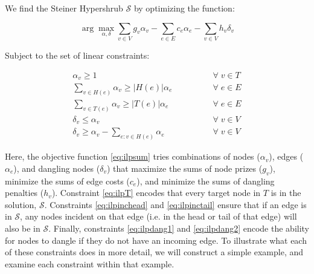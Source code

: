 \documentclass[12pt,twoside]{reedthesis}
\theoremstyle{definition}
\newcommand{\argmax}{\arg\!\max}
\begin{document}
We find the Steiner Hypershrub $\mathcal{S}$ by optimizing the function:

\begin{equation} \label{eq:ilpsum}
 \argmax_{\alpha, \delta} \sum_{v \in V} g_v \alpha_v - \sum_{e \in E} c_e \alpha_e - \sum_{v \in V} h_v \delta_v
\end{equation}

Subject to the set of linear constraints:

\begin{align}
 \alpha_v \geq 1 \qquad\qquad &\forall\; v \in T\label{eq:ilpT}\\
 \sum_{v \in H(e)} \alpha_v \geq \lvert H(e)\rvert \alpha_e \qquad\qquad &\forall\; e \in E\label{eq:ilpinchead}\\
 \sum_{v \in T(e)} \alpha_v \geq \lvert T(e)\rvert \alpha_e\qquad\qquad &\forall\; e \in E\label{eq:ilpinctail}\\
 \delta_v \leq \alpha_v \qquad\qquad &\forall\; v \in V\label{eq:ilpdang1}\\
 \delta_v \geq \alpha_{v} - \sum_{e:v \in H(e)} \alpha_e \qquad\qquad &\forall\; v \in V\label{eq:ilpdang2}%
\end{align}%


Here, the objective function \eqref{eq:ilpsum} tries combinations of nodes ($\alpha_v$), edges ($\alpha_e$), and dangling nodes ($\delta_v$) that maximize the sums of node prizes ($g_v$), minimize the sums of edge costs ($c_e$), and minimize the sums of dangling penalties ($h_v$). Constraint \eqref{eq:ilpT} encodes that every target node in $T$ is in the solution, $\mathcal{S}$.  Constraints \eqref{eq:ilpinchead} and \eqref{eq:ilpinctail} ensure that if an edge is in $\mathcal{S}$, any nodes incident on that edge (i.e. in the head or tail of that edge) will also be in $\mathcal{S}$.  Finally, constraints \eqref{eq:ilpdang1} and \eqref{eq:ilpdang2} encode the ability for nodes to dangle if they do not have an incoming edge. To illustrate what each of these constraints does in more detail, we will construct a simple example, and examine each constraint within that example.\par
\end{document}
